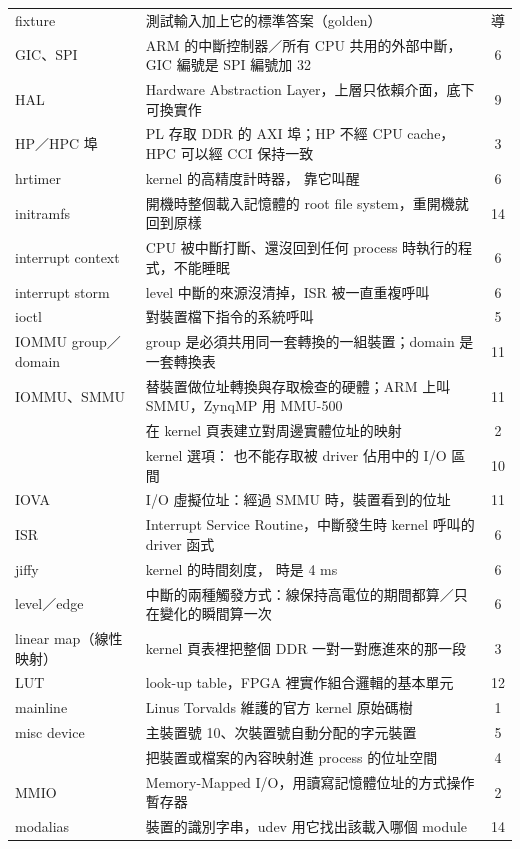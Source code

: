 \begin{xltabular}{\textwidth}{l X c}
fixture & 測試輸入加上它的標準答案（golden） & 導 \\
GIC、SPI & ARM 的中斷控制器／所有 CPU 共用的外部中斷，GIC 編號是 SPI 編號加 32 & 6 \\
HAL & Hardware Abstraction Layer，上層只依賴介面，底下可換實作 & 9 \\
HP／HPC 埠 & PL 存取 DDR 的 AXI 埠；HP 不經 CPU cache，HPC 可以經 CCI 保持一致 & 3 \\
hrtimer & kernel 的高精度計時器， 靠它叫醒 & 6 \\
initramfs & 開機時整個載入記憶體的 root file system，重開機就回到原樣 & 14 \\
interrupt context & CPU 被中斷打斷、還沒回到任何 process 時執行的程式，不能睡眠 & 6 \\
interrupt storm & level 中斷的來源沒清掉，ISR 被一直重複呼叫 & 6 \\
ioctl & 對裝置檔下指令的系統呼叫 & 5 \\
IOMMU group／domain & group 是必須共用同一套轉換的一組裝置；domain 是一套轉換表 & 11 \\
IOMMU、SMMU & 替裝置做位址轉換與存取檢查的硬體；ARM 上叫 SMMU，ZynqMP 用 MMU-500 & 11 \\
 & 在 kernel 頁表建立對周邊實體位址的映射 & 2 \\
 & kernel 選項： 也不能存取被 driver 佔用中的 I/O 區間 & 10 \\
IOVA & I/O 虛擬位址：經過 SMMU 時，裝置看到的位址 & 11 \\
ISR & Interrupt Service Routine，中斷發生時 kernel 呼叫的 driver 函式 & 6 \\
jiffy & kernel 的時間刻度， 時是 4 ms & 6 \\
level／edge & 中斷的兩種觸發方式：線保持高電位的期間都算／只在變化的瞬間算一次 & 6 \\
linear map（線性映射） & kernel 頁表裡把整個 DDR 一對一對應進來的那一段 & 3 \\
LUT & look-up table，FPGA 裡實作組合邏輯的基本單元 & 12 \\
mainline & Linus Torvalds 維護的官方 kernel 原始碼樹 & 1 \\
misc device & 主裝置號 10、次裝置號自動分配的字元裝置 & 5 \\
 & 把裝置或檔案的內容映射進 process 的位址空間 & 4 \\
MMIO & Memory-Mapped I/O，用讀寫記憶體位址的方式操作暫存器 & 2 \\
modalias & 裝置的識別字串，udev 用它找出該載入哪個 module & 14 \\

\end{xltabular}
